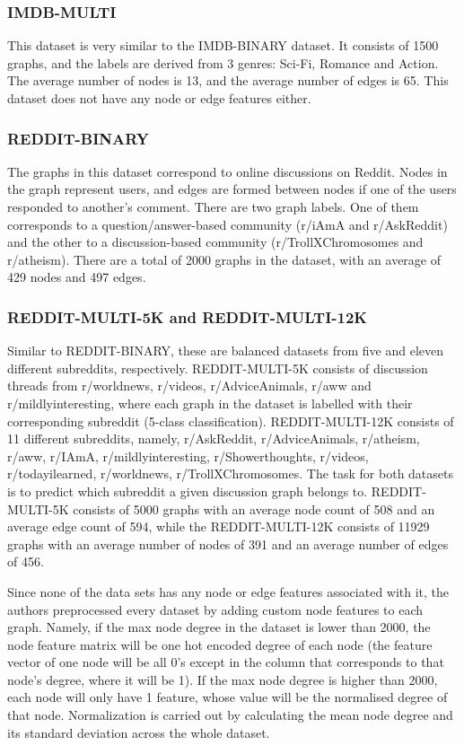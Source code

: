\subsubsection{IMDB-MULTI} This dataset is very similar to the IMDB-BINARY dataset. It consists of 1500 graphs, and the labels are derived from 3 genres: Sci-Fi, Romance and Action. The average number of nodes is 13, and the average number of edges is 65. This dataset does not have any node or edge features either.

\subsubsection{REDDIT-BINARY} The graphs in this dataset correspond to online discussions on Reddit. Nodes in the graph represent users, and edges are formed between nodes if one of the users responded to another's comment. There are two graph labels. One of them corresponds to a question/answer-based community (r/iAmA and r/AskReddit) and the other to a discussion-based community (r/TrollXChromosomes and r/atheism). There are a total of 2000 graphs in the dataset, with an average of 429 nodes and 497 edges.

\subsubsection{REDDIT-MULTI-5K and REDDIT-MULTI-12K} Similar to REDDIT-BINARY, these are balanced datasets from five and eleven different subreddits, respectively. REDDIT-MULTI-5K consists of discussion threads from r/worldnews, r/videos, r/AdviceAnimals, r/aww and r/mildlyinteresting, where each graph in the dataset is labelled with their corresponding subreddit (5-class classification). REDDIT-MULTI-12K consists of 11 different subreddits, namely, r/AskReddit, r/AdviceAnimals, r/atheism, r/aww, r/IAmA, r/mildlyinteresting, r/Showerthoughts, r/videos, r/todayilearned, r/worldnews, r/TrollXChromosomes. The task for both datasets is to predict which subreddit a given discussion graph belongs to. REDDIT-MULTI-5K consists of 5000 graphs with an average node count of 508 and an average edge count of 594, while the REDDIT-MULTI-12K consists of 11929 graphs with an average number of nodes of 391 and an average number of edges of 456.

Since none of the data sets has any node or edge features associated with it, the authors preprocessed every dataset by adding custom node features to each graph. Namely, if the max node degree in the dataset is lower than 2000, the node feature matrix will be one hot encoded degree of each node (the feature vector of one node will be all 0's except in the column that corresponds to that node's degree, where it will be 1). If the max node degree is higher than 2000, each node will only have 1 feature, whose value will be the normalised degree of that node. Normalization is carried out by calculating the mean node degree and its standard deviation across the whole dataset.


